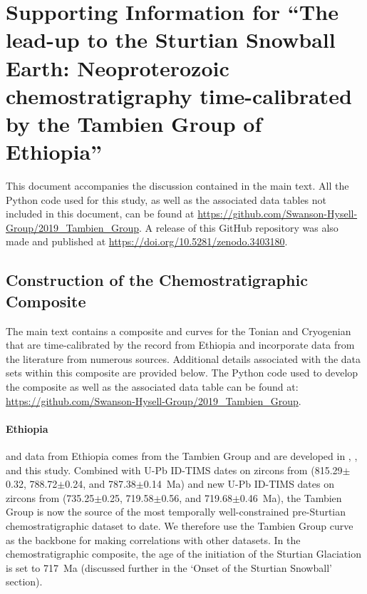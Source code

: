 \chapter[Supporting Information for ``The lead-up to the Sturtian Snowball Earth: Neoproterozoic chemostratigraphy time-calibrated by the Tambien Group of Ethiopia''][Supporting Information - Tambien Group]{Supporting Information for ``The lead-up to the Sturtian Snowball Earth: Neoproterozoic chemostratigraphy time-calibrated by the Tambien Group of Ethiopia''}

This document accompanies the discussion contained in the main text. All the Python code used for this study, as well as the associated data tables not included in this document, can be found at \url{https://github.com/Swanson-Hysell-Group/2019_Tambien_Group}. A release of this GitHub repository was also made and published at \url{https://doi.org/10.5281/zenodo.3403180}.

\section{Construction of the Chemostratigraphic Composite}

The main text contains a composite \dC and \SrSr curves for the Tonian and Cryogenian that are time-calibrated by the record from Ethiopia and incorporate data from the literature from numerous sources. Additional details associated with the data sets within this composite are provided below. The Python code used to develop the composite as well as the associated data table can be found at: \url{https://github.com/Swanson-Hysell-Group/2019_Tambien_Group}.

\subsubsection{Ethiopia}

\dC and \SrSr data from Ethiopia comes from the Tambien Group and are developed in \citet{Miller2009a}, \citet{Swanson-Hysell2015a}, and this study. Combined with U-Pb ID-TIMS dates on zircons from \citet{Swanson-Hysell2015a} (815.29$\pm$0.32, 788.72$\pm$0.24, and 787.38$\pm$0.14~Ma) and new U-Pb ID-TIMS dates on zircons from \citet{MacLennan2018a} (735.25$\pm$0.25, 719.58$\pm$0.56, and 719.68$\pm$0.46~Ma), the Tambien Group is now the source of the most temporally well-constrained pre-Sturtian chemostratigraphic dataset to date. We therefore use the Tambien Group \dC curve as the backbone for making correlations with other datasets. In the chemostratigraphic composite, the age of the initiation of the Sturtian Glaciation is set to 717~Ma (discussed further in the `Onset of the Sturtian Snowball' section).

